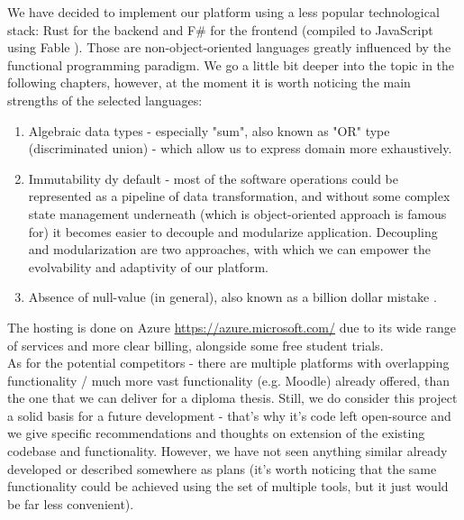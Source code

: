 \documentclass[a4paper,11pt,twoside]{report}
\theoremstyle{definition}
\begin{document}
We have decided to implement our platform using a less popular technological stack: Rust \cite{rust} for the backend and F\# \cite{fsharp} for the frontend (compiled to JavaScript using Fable \cite{fable}). Those are non-object-oriented languages greatly influenced by the functional programming paradigm. We go a little bit deeper into the topic in the following chapters, however, at the moment it is worth noticing the main strengths of the selected languages: 
\begin{enumerate}
	\item Algebraic data types - especially "sum", also known as "OR" type (discriminated union) - which allow us to express domain more exhaustively.
	\item Immutability dy default - most of the software operations could be represented as a pipeline of data transformation, and without some complex state management underneath (which is object-oriented approach is famous for) it becomes easier to decouple and modularize application. Decoupling and modularization are two approaches, with which we can empower the evolvability and adaptivity of our platform.
	\item Absence of null-value (in general), also known as a billion dollar mistake \cite{null}.
\end{enumerate}
The hosting is done on Azure \href{https://azure.microsoft.com/}{https://azure.microsoft.com/} due to its wide range of services and more clear billing, alongside some free student trials. \\ 
As for the potential competitors - there are multiple platforms with overlapping functionality / much more vast functionality (e.g. Moodle) already offered, than the one that we can deliver for a diploma thesis. Still, we do consider this project a solid basis for a future development - that's why it's code left open-source and we give specific recommendations and thoughts on extension of the existing codebase and functionality. However, we have not seen anything similar already developed or described somewhere as plans (it's worth noticing that the same functionality could be achieved using the set of multiple tools, but it just would be far less convenient).
\end{document}
